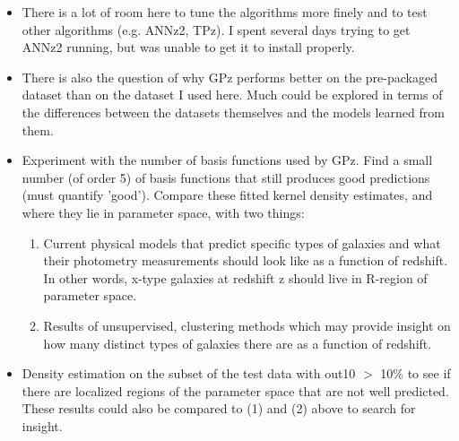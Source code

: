 \documentclass[13pt]{amsart}
\begin{document}
    \begin{itemize}
      \item There is a lot of room here to tune the algorithms more finely and to test other algorithms (e.g. ANNz2, TPz). I spent several days trying to get ANNz2 running, but was unable to get it to install properly.

      \item There is also the question of why GPz performs better on the pre-packaged dataset than on the dataset I used here. Much could be explored in terms of the differences between the datasets themselves and the models learned from them.

      \item Experiment with the number of basis functions used by GPz. Find a small number (of order 5) of basis functions that still produces good predictions (must quantify 'good'). Compare these fitted kernel density estimates, and where they lie in parameter space, with two things:
        \begin{enumerate}

          \item Current physical models that predict specific types of galaxies and what their photometry measurements should look like as a function of redshift. In other words, x-type galaxies at redshift z should live in R-region of parameter space.

          \item Results of unsupervised, clustering methods which may provide insight on how many distinct types of galaxies there are as a function of redshift.
        \end{enumerate}

      \item Density estimation on the subset of the test data with out10 $>$ 10\% to see if there are localized regions of the parameter space that are not well predicted. These results could also be compared to (1) and (2) above to search for insight.

    \end{itemize}




\end{document}
